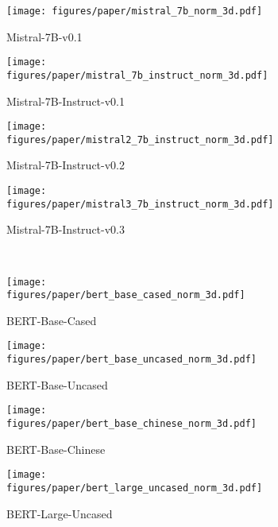 \begin{figure}[t]
    \centering
    \begin{subfigure}[t]{0.24\linewidth}
        \texttt{[image: figures/paper/mistral\_7b\_norm\_3d.pdf]}
        \caption{Mistral-7B-v0.1}\label{fig:mistral_7b_norm_3d}
    \end{subfigure}
    \begin{subfigure}[t]{0.24\linewidth}
        \texttt{[image: figures/paper/mistral\_7b\_instruct\_norm\_3d.pdf]}
        \caption{Mistral-7B-Instruct-v0.1}\label{fig:mistral_7b_instruct_norm_3d}
    \end{subfigure}
    \begin{subfigure}[t]{0.24\linewidth}
        \texttt{[image: figures/paper/mistral2\_7b\_instruct\_norm\_3d.pdf]}
        \caption{Mistral-7B-Instruct-v0.2}\label{fig:mistral2_7b_instruct_norm_3d}
    \end{subfigure}
    \begin{subfigure}[t]{0.24\linewidth}
        \texttt{[image: figures/paper/mistral3\_7b\_instruct\_norm\_3d.pdf]}
        \caption{Mistral-7B-Instruct-v0.3}\label{fig:mistral3_7b_instruct_norm_3d}
    \end{subfigure}\\
    \begin{subfigure}[t]{0.24\linewidth}
        \texttt{[image: figures/paper/bert\_base\_cased\_norm\_3d.pdf]}
        \caption{BERT-Base-Cased}\label{fig:bert_base_cased_norm_3d}
    \end{subfigure}
    \begin{subfigure}[t]{0.24\linewidth}
        \texttt{[image: figures/paper/bert\_base\_uncased\_norm\_3d.pdf]}
        \caption{BERT-Base-Uncased}\label{fig:bert_base_uncased_norm_3d}
    \end{subfigure}
    \begin{subfigure}[t]{0.24\linewidth}
        \texttt{[image: figures/paper/bert\_base\_chinese\_norm\_3d.pdf]}
        \caption{BERT-Base-Chinese}\label{fig:bert_base_chinese_norm_3d}
    \end{subfigure}
    \begin{subfigure}[t]{0.24\linewidth}
        \texttt{[image: figures/paper/bert\_large\_uncased\_norm\_3d.pdf]}
        \caption{BERT-Large-Uncased}\label{fig:bert_large_uncased_norm_3d}
    \end{subfigure}\\
    \begin{subfigure}[t]{0.24\linewidth}

\end{subfigure}
\end{figure}
